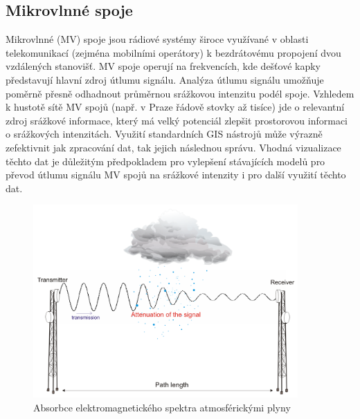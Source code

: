 \documentclass[a4paper,12pt]{article}
\begin{document}
\subsection{Mikrovlnné spoje}
Mikrovlnné (MV) spoje jsou rádiové systémy široce využívané v oblasti telekomunikací (zejména 
mobilními operátory) k bezdrátovému propojení dvou vzdálených stanovišť. MV spoje operují na 
frekvencích, kde dešťové kapky představují hlavní zdroj útlumu signálu. Analýza útlumu signálu 
umožňuje poměrně přesně odhadnout průměrnou srážkovou intenzitu podél spoje. Vzhledem 
k hustotě sítě MV spojů (např. v Praze řádově stovky až tisíce) jde o relevantní zdroj srážkové 
informace, který má velký potenciál zlepšit prostorovou informaci o srážkových intenzitách. Využití 
standardních GIS nástrojů může výrazně zefektivnit jak zpracování dat, tak jejich následnou správu. 
Vhodná vizualizace těchto dat je důležitým předpokladem pro vylepšení stávajících modelů pro 
převod útlumu signálu MV spojů na srážkové intenzity i pro další využití těchto dat.
 
\begin{figure}[h!]
    \centering
    \includegraphics[width=0.9\textwidth]{./img/srazky/microwave_link.png}
    \caption[Rušení radaru]{\centering Absorbce elektromagnetického spektra atmosférickými plyny  \footnotemark }
 \end{figure}   
    
\end{document}

